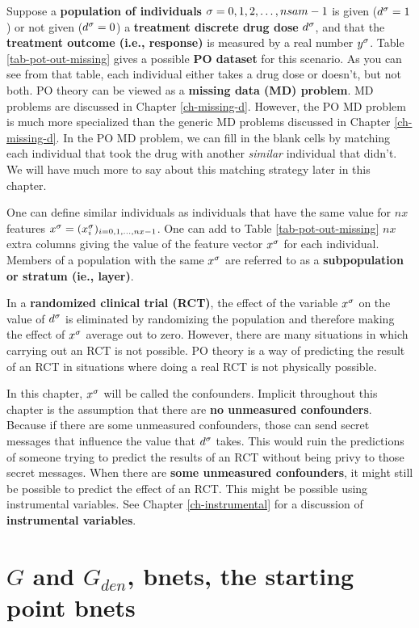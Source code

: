 Suppose a {\bf population
of individuals} $\sigma=0,1,2, \ldots, nsam-1$
is given ($d^\sigma=1$) or
not given ($d^\sigma=0$)
a {\bf treatment discrete drug dose} $d^\sigma$,
and that
the 
 {\bf treatment outcome (i.e., response)}
is measured by
a real number $y^\sigma$.
Table \ref{tab-pot-out-missing}
gives a possible {\bf PO dataset}
for this scenario.
As you
can see from
that table,
each individual 
either takes a drug
dose or
doesn't,
but not both.
PO theory
can be viewed as a
 {\bf  missing
data (MD) problem}. MD problems are 
discussed in
 Chapter \ref{ch-missing-d}.
However, the PO MD problem 
is much more specialized
than the generic MD problems
discussed in Chapter \ref{ch-missing-d}.
In the PO MD
problem, we can
fill
in the blank cells
by matching
each individual
that took
the drug with
another {\it similar} 
individual that didn't.
We will have much
more to say about
this matching
strategy later in this chapter.

One can define
similar
individuals as 
individuals that have the same
value
for $nx$ features $x^\sigma=(x^\sigma_i)_{i=0, 1, \ldots, nx-1}$.
One
can add to Table \ref{tab-pot-out-missing}
 $nx$ extra columns
giving the value of
the feature vector $x^\sigma$
for each individual.
Members
of a population with
the same $x^\sigma$ 
are referred to as 
a
{\bf subpopulation or stratum (ie., layer)}.

In a {\bf randomized clinical trial (RCT)},
the effect 
of the variable $x^\sigma$ on 
the value
of $d^\sigma$
is eliminated by
randomizing
the population
and therefore
making the effect of $x^\sigma$
average out  to zero.
However,
there are many situations
in which carrying out an RCT is not
possible. PO theory is
a way of predicting the
result
of an RCT in situations where
doing a real RCT is not physically possible.

In this chapter, $x^\sigma$
will be called the confounders.
Implicit throughout this chapter
is the assumption that there are {\bf 
no unmeasured confounders}.
Because if 
there are some unmeasured confounders,
those can
send secret messages 
that influence the value 
that $d^\sigma$ takes.
This would ruin
the
predictions
of someone trying
to predict the results of an RCT
without
being privy to those secret 
messages.
When there are {\bf some
unmeasured confounders},
it might still be
possible
to
predict the effect of an RCT.
This might be possible
using instrumental variables. See Chapter
\ref{ch-instrumental}
for a discussion
of {\bf instrumental
variables}.


\section{$G$ and $G_{den}$,
bnets,
the starting point bnets}


